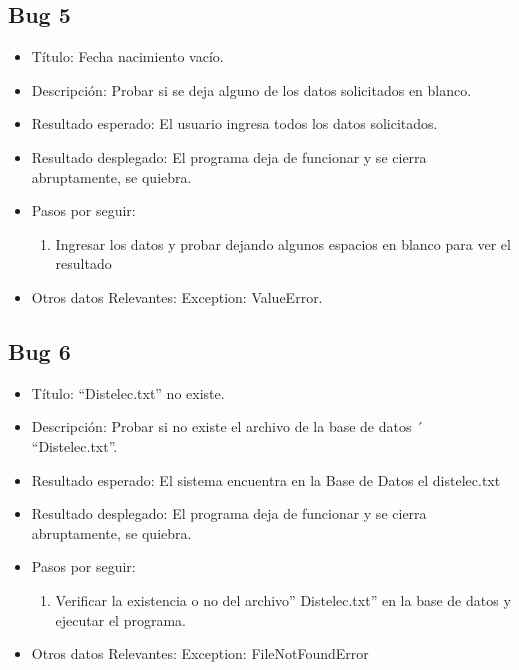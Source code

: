 \documentclass[conference]{IEEEtran}
\begin{document}
\subsection*{Bug 5}
\begin{itemize}
\item Título: Fecha nacimiento vacío.

\item Descripción: Probar si se deja alguno de los datos solicitados en blanco.

\item Resultado esperado: El usuario ingresa todos los datos solicitados.

\item Resultado desplegado: El programa deja de funcionar y se cierra abruptamente, se quiebra. 

\item Pasos por seguir: 
\begin{enumerate}
\item Ingresar los datos y probar dejando algunos espacios en blanco para ver el resultado
\end{enumerate}
\item Otros datos Relevantes: Exception: ValueError.
\end{itemize}
\subsection*{Bug 6}
\begin{itemize}
\item Título: “Distelec.txt” no existe.

\item Descripción: Probar si no existe el archivo de la base de datos ´ “Distelec.txt”.

\item Resultado esperado: El sistema encuentra en la Base de Datos el distelec.txt

\item Resultado desplegado: El programa deja de funcionar y se cierra abruptamente, se quiebra. 

\item Pasos por seguir: 
\begin{enumerate}
\item Verificar la existencia o no del archivo” Distelec.txt” en la base de datos y ejecutar el programa.
\end{enumerate}

\item Otros datos Relevantes: Exception: FileNotFoundError

\end{itemize}
\end{document}
